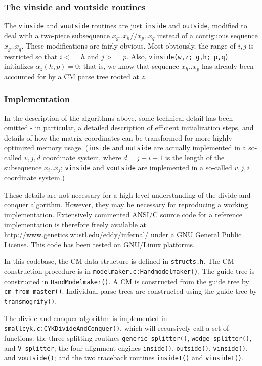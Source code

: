\documentclass[11pt]{article}
\begin{document}
\subsubsection{The vinside and voutside routines}

The \texttt{vinside} and \texttt{voutside} routines are just
\texttt{inside} and \texttt{outside}, modified to deal with a
two-piece subsequence $x_g..x_h//x_p..x_q$ instead of a contiguous
sequence $x_g..x_q$. These modifications are fairly obvious.  Most
obviously, the range of $i,j$ is restricted so that $i<=h$ and $j>=p$.
Also, \texttt{vinside(w,z; g,h; p,q)} initializes $\alpha_z(h,p) = 0$:
that is, we know that sequence $x_h..x_p$ has already been accounted
for by a CM parse tree rooted at $z$. 

\subsubsection{Implementation}

In the description of the algorithms above, some technical detail has
been omitted - in particular, a detailed description of efficient
initialization steps, and details of how the matrix coordinates can be
transformed for more highly optimized memory usage. (\texttt{inside}
and \texttt{outside} are actually implemented in a so-called $v,j,d$
coordinate system, where $d = j-i+1$ is the length of the subsequence
$x_i..x_j$; \texttt{vinside} and \texttt{voutside} are implemented in
a so-called $v,j,i$ coordinate system.) 

These details are not necessary for a high level understanding of the
divide and conquer algorithm. However, they may be necessary for
reproducing a working implementation. Extensively commented ANSI/C
source code for a reference implementation is therefore freely
available at \url{http://www.genetics.wustl.edu/eddy/infernal/} under
a GNU General Public License. This code has been tested on GNU/Linux
platforms.

In this codebase, the CM data structure is defined in
\texttt{structs.h}. The CM construction procedure is in
\texttt{modelmaker.c:Handmodelmaker()}. The guide tree is constructed
in \texttt{HandModelmaker()}. A CM is constructed from the guide tree
by \texttt{cm\_from\_master()}. Individual parse trees are constructed
using the guide tree by \texttt{transmogrify()}.

The divide and conquer algorithm is implemented in
\texttt{smallcyk.c:CYKDivideAndConquer()}, which will recursively call
a set of functions: the three splitting routines
\texttt{generic\_splitter()}, \texttt{wedge\_splitter()}, and
\texttt{V\_splitter}; the four alignment engines \texttt{inside()},
\texttt{outside()}, \texttt{vinside()}, and \texttt{voutside()}; and
the two traceback routines \texttt{insideT()} and \texttt{vinsideT()}.
\end{document}
